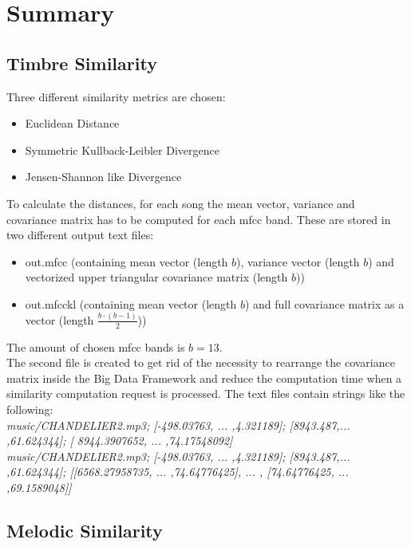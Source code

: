 \section{Summary}\label{sumfeat}

\subsection{Timbre Similarity}

Three different similarity metrics are chosen: 
\begin{itemize}
	\item Euclidean Distance
	\item Symmetric Kullback-Leibler Divergence
	\item Jensen-Shannon like Divergence
\end{itemize}
To calculate the distances, for each song the mean vector, variance and covariance matrix has to be computed for each mfcc band. These are stored in two different output text files: 
\begin{itemize}
	\item out.mfcc (containing mean vector (length $b$), variance vector (length $b$) and vectorized upper triangular covariance matrix (length $b$))
	\item out.mfcckl (containing mean vector (length $b$) and full covariance matrix as a vector (length $\frac{b \cdot (b-1)}{2}$))
\end{itemize}
The amount of chosen mfcc bands is $b = 13$.\\
The second file is created to get rid of the necessity to rearrange the covariance matrix inside the Big Data Framework and reduce the computation time when a similarity computation request is processed.
The text files contain strings like the following:\\
\textit{music/CHANDELIER2.mp3; [-498.03763,  ... ,4.321189]; [8943.487,... ,61.624344]; [ 8944.3907652, ... ,74.17548092]}\\
\textit{music/CHANDELIER2.mp3; [-498.03763,  ... ,4.321189]; [8943.487,... ,61.624344]; [[6568.27958735, ... ,74.64776425], ... , [74.64776425, ... ,69.1589048]]}

\subsection{Melodic Similarity}

